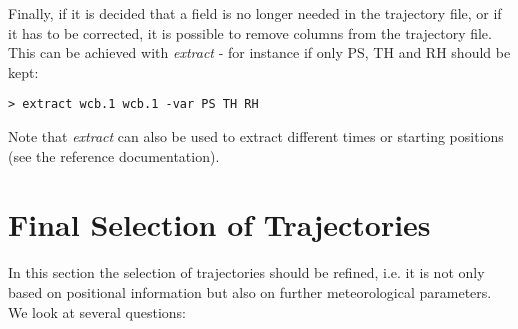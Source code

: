 \documentclass[a4paper,10pt]{article}
\begin{document}
\noindent
Finally, if it is decided that a field is no longer needed in the trajectory file, or if it has to be corrected, it is possible to remove columns from the trajectory file. This can be achieved with {\em extract} - for instance if only PS, TH and RH should be kept:

\begin{verbatim}
> extract wcb.1 wcb.1 -var PS TH RH
\end{verbatim}

\noindent
Note that {\em extract} can also be used to extract different times or starting positions (see the reference documentation). 


\section{Final Selection of Trajectories}

In this section the selection of trajectories should be refined, i.e. it is not only based on positional information but also on further meteorological parameters. We look at several questions:\\
\end{document}
